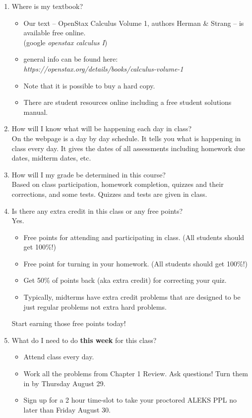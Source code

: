 \documentclass[11pt,fleqn]{article}
\begin{document}
\begin{enumerate}
\vfill
\item Where is my textbook?
\begin{itemize}
\item Our text -- OpenStax Calculus Volume 1, authors Herman \& Strang -- is available free online. \\
(google \emph{openstax calculus I})
\item general info can be found here: \textit{https://openstax.org/details/books/calculus-volume-1} 
\item Note that it is possible to buy a hard copy. 
\item There are student resources online including a free student solutions manual.
\end{itemize}
\vfill
\item How will I know what will be happening each day in class?\\
On the webpage is a day by day schedule. It tells you what is happening in class every day. It gives the dates of all assessments including homework due dates, midterm dates, etc. 
\vfill
\item How will I my grade be determined in this course? \\
Based on class participation, homework completion, quizzes and their corrections, and some tests. Quizzes and tests are given in class.
\vfill
\item Is there any extra credit in this class or any free points?\\
Yes. \\
\begin{itemize}
	\item Free points for attending and participating in class. (All students should get 100\%!)
	\item Free point for turning in your homework. (All students should get 100\%!)
	\item Get 50\% of points back (aka extra credit) for correcting your quiz.
	\item Typically, midterms have extra credit problems that are designed to be just regular problems not extra hard problems.
\end{itemize}
Start earning those free points today!
\vfill
\item What do I need to do \textbf{this week} for this class?
\begin{itemize}
\item Attend class every day. 
\item Work all the problems from Chapter 1 Review. Ask questions! Turn them in by Thursday August 29. 
\item Sign up for a 2 hour time-slot to take your proctored ALEKS PPL no later than Friday August 30.
\end{itemize}
\vfill


\end{enumerate}
\end{document}
